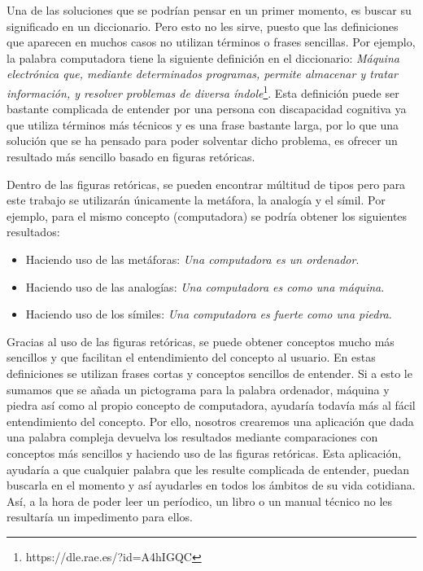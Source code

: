 Una de las soluciones que se podrían pensar en un primer momento, es buscar su significado en un diccionario. Pero esto no les sirve, puesto que las definiciones que aparecen en muchos casos no utilizan términos o frases sencillas. Por ejemplo, la palabra computadora tiene la siguiente definición en el diccionario: 
\textit{Máquina electrónica que, mediante determinados programas, permite almacenar y tratar información, y resolver problemas de diversa índole}\footnote{https://dle.rae.es/?id=A4hIGQC}. 
Esta definición puede ser bastante complicada de entender por una persona con discapacidad cognitiva ya que utiliza términos más técnicos y es una frase bastante larga, por lo que una solución que se ha pensado para poder solventar dicho problema, es ofrecer un resultado más sencillo basado en figuras retóricas.

Dentro de las figuras retóricas, se pueden encontrar múltitud de tipos pero para este trabajo se utilizarán únicamente la metáfora, la analogía y el símil.
Por ejemplo, para el mismo concepto (computadora) se podría obtener los siguientes resultados:
\begin{itemize}
	\item Haciendo uso de las metáforas: \textit{Una computadora es un ordenador}. 
	\item Haciendo uso de las analogías: \textit{Una computadora es como una máquina}.
	\item Haciendo uso de los símiles: \textit{Una computadora es fuerte como una piedra}.
\end{itemize}

Gracias al uso de las figuras retóricas, se puede obtener conceptos mucho más sencillos y que facilitan el entendimiento del concepto al usuario. En estas definiciones se utilizan frases cortas y conceptos sencillos de entender. Si a esto le sumamos que se añada un pictograma para la palabra ordenador, máquina y piedra así como al propio concepto de computadora, ayudaría todavía más al fácil entendimiento del concepto.
Por ello, nosotros crearemos una aplicación que dada una palabra compleja devuelva los resultados mediante comparaciones con conceptos más sencillos y haciendo uso de las figuras retóricas.
Esta aplicación, ayudaría a que cualquier palabra que les resulte complicada de entender, puedan buscarla en el momento y así ayudarles en todos los ámbitos de su vida cotidiana. Así, a la hora de poder leer un períodico, un libro o un manual técnico no les resultaría un impedimento para ellos.









